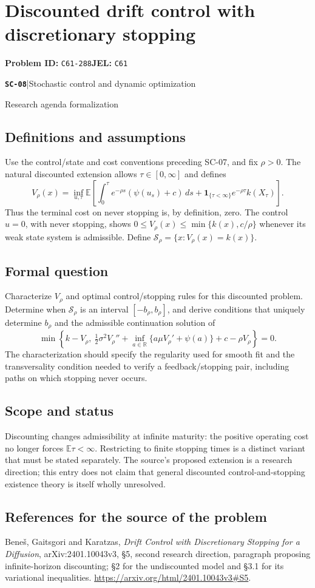 \documentclass[11pt,a4paper]{article}
\newcommand{\R}{\mathbb R}
\newcommand{\E}{\mathbb E}
\newcommand{\ind}{\mathbf 1}
\newcommand{\entrymeta}[3]{{\sffamily\small\color{muted}\textbf{\texttt{#1}}\quad|\quad #2\par #3\par}}
\begin{document}
\section*{Discounted drift control with discretionary stopping}
\textbf{Problem ID:} \texttt{C61-288}\quad \textbf{JEL:} \texttt{C61}\par
\label{problem:OP-0569}
\label{beyond:SC-08}
\entrymeta{SC-08}{Stochastic control and dynamic optimization}{Research agenda formalization}
\subsection*{Definitions and assumptions}
Use the control/state and cost conventions preceding SC-07, and fix
$\rho>0$. The natural discounted extension allows $\tau\in[0,\infty]$
and defines
\[
 V_\rho(x)=\inf_{u,\tau}
 \E\left[\int_0^\tau e^{-\rho s}(\psi(u_s)+c)\,ds
 +\ind_{\{\tau<\infty\}}e^{-\rho\tau}k(X_\tau)\right].
\]
Thus the terminal cost on never stopping is, by definition, zero.
The control $u=0$, with never stopping, shows
$0\leq V_\rho(x)\leq\min\{k(x),c/\rho\}$ whenever its weak state
system is admissible. Define $\mathcal S_\rho=\{x:V_\rho(x)=k(x)\}$.
\subsection*{Formal question}
Characterize $V_\rho$ and optimal control/stopping rules for this
discounted problem. Determine when $\mathcal S_\rho$ is an interval
$[-b_\rho,b_\rho]$, and derive conditions that uniquely determine
$b_\rho$ and the admissible continuation solution of
\[
 \min\left\{k-V_\rho,\ \tfrac12\sigma^2V_\rho''+
 \inf_{a\in\R}\{a\mu V_\rho'+\psi(a)\}+c-\rho V_\rho\right\}=0.
\]
The characterization should specify the regularity used for smooth fit
and the transversality condition needed to verify a feedback/stopping
pair, including paths on which stopping never occurs.
\subsection*{Scope and status}
Discounting changes admissibility at infinite maturity: the positive
operating cost no longer forces $\E\tau<\infty$. Restricting to finite
stopping times is a distinct variant that must be stated separately.
The source's proposed extension is a research direction; this entry
does not claim that general discounted control-and-stopping existence
theory is itself wholly unresolved.
\subsection*{References for the source of the problem}
Bene\v{s}, Gaitsgori and Karatzas, \emph{Drift Control with Discretionary
Stopping for a Diffusion}, arXiv:2401.10043v3, \S5, second research
direction, paragraph proposing infinite-horizon discounting;
\S2 for the undiscounted model and \S3.1 for its variational inequalities.
\url{https://arxiv.org/html/2401.10043v3#S5}.
\end{document}
